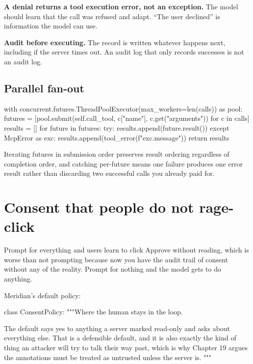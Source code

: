 \textbf{A denial returns a tool execution error, not an exception.} The model should learn that the call was refused and adapt. ``The user declined'' is information the model can use.

\textbf{Audit before executing.} The record is written whatever happens next,
including if the server times out. An audit log that only records successes is
not an audit log.

\subsection{Parallel fan-out}

\begin{py}
with concurrent.futures.ThreadPoolExecutor(max_workers=len(calls)) as pool:
    futures = [pool.submit(self.call_tool, c["name"], c.get("arguments"))
               for c in calls]
    results = []
    for future in futures:
        try:
            results.append(future.result())
        except McpError as exc:
            results.append(tool_error(f"{exc.message}"))
    return results
\end{py}

Iterating futures in submission order preserves result ordering regardless of
completion order, and catching per-future means one failure produces one error
result rather than discarding two successful calls you already paid for.

\section{Consent that people do not rage-click}

Prompt for everything and users learn to click Approve without reading, which is
worse than not prompting because now you have the audit trail of consent without
any of the reality. Prompt for nothing and the model gets to do anything.

Meridian's default policy:

\begin{py}
class ConsentPolicy:
    """Where the human stays in the loop.

    The default says yes to anything a server marked read-only and asks about
    everything else. That is a defensible default, and it is also exactly the
    kind of thing an attacker will try to talk their way past, which is why
    Chapter 19 argues the annotations must be treated as untrusted unless the
    server is.
    """
\end{py}

